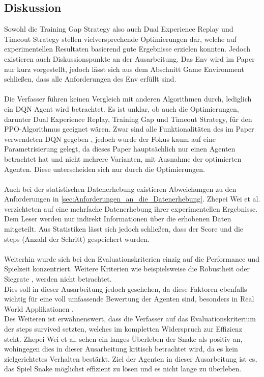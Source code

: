 \subsection{Diskussion} \label{subsec:Verwandte_Arbeiten_Paper_1_Diskussion}
Sowohl die Training Gap Strategy also auch Dual Experience Replay und Timeout Strategy stellen vielversprechende Optimierungen dar, welche auf experimentellen Resultaten basierend gute Ergebnisse erzielen konnten. Jedoch existieren auch Diskussionspunkte an der Ausarbeitung.
Das Env wird im Paper nur kurz vorgestellt, jedoch lässt sich aus dem Abschnitt Game Environment schließen, dass alle Anforderungen des Env  erfüllt sind.\\
\\Die Verfasser führen keinen Vergleich mit anderen Algorithmen durch, lediglich ein DQN Agent wird betrachtet. 
Es ist unklar, ob auch die Optimierungen, darunter Dual Experience Replay, Training Gap und Timeout Strategy, für den PPO-Algorithmus geeignet wären.
Zwar sind alle Funktionalitäten des im Paper verwendeten DQN gegeben , jedoch wurde der Fokus kaum auf eine Parametrisierung  gelegt, da dieses Paper hauptsächlich nur einen Agenten betrachtet hat und nicht mehrere Varianten, mit Ausnahme der optimierten Agenten. Diese unterscheiden sich nur durch die Optimierungen.\\
\\Auch bei der statistischen Datenerhebung existieren Abweichungen zu den Anforderungen in \autoref{sec:Anforderungen_an_die_Datenerhebung}. Zhepei Wei et al. verzichteten auf eine mehrfache Datenerhebung ihrer experimentellen Ergebnisse. Dem Leser werden nur indirekt Informationen über die erhobenen Daten mitgeteilt. Aus Statistiken lässt sich jedoch schließen, dass der Score und die steps (Anzahl der Schritt) gespeichert wurden.\\
\\Weiterhin wurde sich bei den Evaluationskriterien einzig auf die Performance und Spielzeit konzentriert. Weitere Kriterien wie beispielsweise die Robustheit oder Siegrate , werden nicht betrachtet.\\
Dies soll in dieser Ausarbeitung jedoch geschehen, da diese Faktoren ebenfalls wichtig für eine voll umfassende Bewertung der Agenten sind, besonders in Real World Applikationen .\\ 
Des Weiteren ist erwähnenswert, dass die Verfasser auf das Evaluationskriterium der steps survived setzten, welches im kompletten Widerspruch zur Effizienz  steht. Zhepei Wei et al. sehen ein langes Überleben der Snake als positiv an, wohingegen dies in dieser Ausarbeitung kritisch betrachtet wird, da es kein zielgerichtetes Verhalten bestärkt. Ziel der Agenten in dieser Ausarbeitung ist es, das Spiel Snake möglichst effizient zu lösen und es nicht lange zu überleben.

